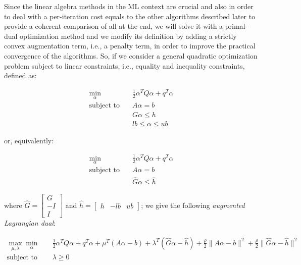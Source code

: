 \bigskip

Since the linear algebra methods in the ML context are crucial and also in order to deal with a per-iteration cost equals to the other algorithms described later to provide a coherent comparison of all at the end, we will solve it with a primal-dual optimization method and we modify its definition by adding a strictly convex augmentation term, i.e., a penalty term, in order to improve the practical convergence of the algorithms. So, if we consider a general quadratic optimization problem subject to linear constraints, i.e., equality and inequality constraints, defined as:

\begin{equation}
    \begin{aligned} 
        \min_{\alpha} \quad & \frac{1}{2} \alpha^T Q \alpha + q^T \alpha \\
            \textrm{subject to} \quad & A \alpha = b \\ & G \alpha \leq h \\ & lb \leq \alpha \leq ub
    \end{aligned}
\end{equation}

or, equivalently:

\begin{equation}
    \begin{aligned}
        \min_{\alpha} \quad & \frac{1}{2} \alpha^T Q \alpha + q^T \alpha \\
            \textrm{subject to} \quad & A \alpha = b \\ & \hat{G} \alpha \leq \hat{h}
    \end{aligned}
\end{equation}

where $\hat{G} =
\begin{bmatrix}
 G \\
-I \\
 I 
\end{bmatrix}$ and $\hat{h} =
\begin{bmatrix}
h & -lb & ub
\end{bmatrix}$; we give the following \emph{augmented Lagrangian dual}:

\begin{equation} \label{eq:l1_svr_gen_aug_lagrangian_dual}
	\begin{aligned}
		    \max_{\mu,\lambda} \min_{\alpha} \quad & \frac{1}{2} \alpha^T Q \alpha + q^T \alpha + \mu^T (A \alpha - b) + \lambda^T (\hat{G} \alpha - \hat{h}) + \frac{\rho}{2} \| A \alpha - b \|^2 + \frac{\rho}{2} \| \hat{G} \alpha - \hat{h} \|^2 \\
    \text{subject to} \quad & \lambda \geq 0
	\end{aligned}
\end{equation}

